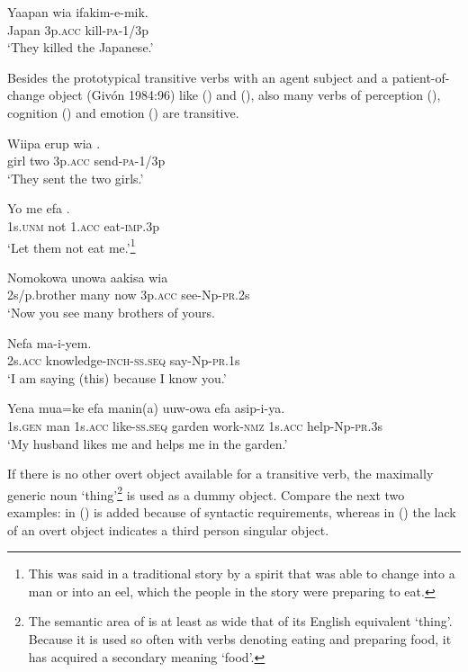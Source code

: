 \ea%
\label{ex:x294}
\gll Yaapan wia ifakim-e-mik. \\
Japan 3p.\textsc{acc} kill-\textsc{pa}-1/3p \\
\glt`They killed the Japanese.'
\z

Besides the prototypical transitive verbs with an agent subject and a patient-of-change object (Giv\'on 1984:96) like () and (), also many verbs of perception (), cognition () and emotion () are transitive.

\ea%
\label{ex:x295}
\gll Wiipa erup wia . \\
girl two 3p.\textsc{acc} send-\textsc{pa}-1/3p \\
\glt`They sent the two girls.'
\z

\ea%
\label{ex:x296}
\gll Yo me efa . \\
1s.\textsc{unm} not 1.\textsc{acc} eat-\textsc{imp}.3p \\
\glt`Let them not eat me.'\footnote{This was said in a traditional story by a spirit that was able to change into a man or into an eel, which the people in the story were preparing to eat.}
\z

\ea%
\label{ex:x297}
\gll Nomokowa unowa aakisa wia  \\
2s/p.brother many now 3p.\textsc{acc} see-Np-\textsc{pr}.2s \\
\glt`Now you see many brothers of yours.
\z

\ea%
\label{ex:x298}
\gll Nefa  ma-i-yem. \\
2s.\textsc{acc} knowledge-\textsc{inch}-\textsc{ss}.\textsc{seq} say-Np-\textsc{pr}.1s \\
\glt`I am saying (this) because I know you.'
\z

\ea%
\label{ex:x299}
\gll Yena mua=ke efa  manin(a) uuw-owa efa asip-i-ya.\\
1s.\textsc{gen} man 1s.\textsc{acc} like-\textsc{ss}.\textsc{seq} garden work-\textsc{nmz} 1s.\textsc{acc} help-Np-\textsc{pr}.3s\\
\glt`My husband likes me and helps me in the garden.'
\z

If there is no other overt object available for a transitive verb, the maximally generic noun  `thing'\footnote{The semantic area of  is at least as wide that of its English equivalent `thing'. Because it is used so often with verbs denoting eating and preparing food, it has acquired a secondary meaning `food'.} is used as a dummy object. Compare the next two examples: in ()  is added because of syntactic requirements, whereas in () the lack of an overt object indicates a third person singular object.

